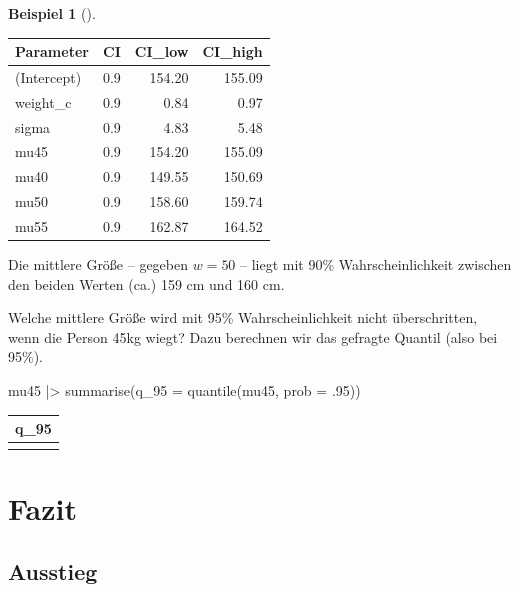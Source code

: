 \documentclass[
  ngerman,
  letterpaper,
  twoside,
  open=any]{scrbook}
\newenvironment{Shaded}{\begin{snugshade}}{\end{snugshade}}
\newcommand{\AttributeTok}[1]{\textcolor[rgb]{0.40,0.45,0.13}{#1}}
\newcommand{\DecValTok}[1]{\textcolor[rgb]{0.68,0.00,0.00}{#1}}
\newcommand{\FunctionTok}[1]{\textcolor[rgb]{0.28,0.35,0.67}{#1}}
\newcommand{\NormalTok}[1]{\textcolor[rgb]{0.00,0.23,0.31}{#1}}
\newcommand{\SpecialCharTok}[1]{\textcolor[rgb]{0.37,0.37,0.37}{#1}}
\newcounter{none} %
\theoremstyle{definition}
\newtheorem{example}{Beispiel}[chapter]
\theoremstyle{plain}
\theoremstyle{definition}
\theoremstyle{definition}
\theoremstyle{remark}
\begin{document}
\begin{example}[]
{\def\LTcaptype{none} %
\begin{longtable}[]{@{}lrrr@{}}
\toprule\noalign{}
Parameter & CI & CI\_low & CI\_high \\
\midrule\noalign{}
\endhead
\bottomrule\noalign{}
\endlastfoot
(Intercept) & 0.9 & 154.20 & 155.09 \\
weight\_c & 0.9 & 0.84 & 0.97 \\
sigma & 0.9 & 4.83 & 5.48 \\
mu45 & 0.9 & 154.20 & 155.09 \\
mu40 & 0.9 & 149.55 & 150.69 \\
mu50 & 0.9 & 158.60 & 159.74 \\
mu55 & 0.9 & 162.87 & 164.52 \\
\end{longtable}
}

Die mittlere Größe -- gegeben \(w=50\) -- liegt mit 90\%
Wahrscheinlichkeit zwischen den beiden Werten (ca.) 159 cm und 160 cm.

Welche mittlere Größe wird mit 95\% Wahrscheinlichkeit nicht
überschritten, wenn die Person 45kg wiegt? Dazu berechnen wir das
gefragte Quantil (also bei 95\%).

\begin{Shaded}
\begin{Highlighting}[]
\NormalTok{mu45 }\SpecialCharTok{|\textgreater{}}
  \FunctionTok{summarise}\NormalTok{(}\AttributeTok{q\_95 =} \FunctionTok{quantile}\NormalTok{(mu45, }\AttributeTok{prob =}\NormalTok{ .}\DecValTok{95}\NormalTok{))}
\end{Highlighting}
\end{Shaded}

{\def\LTcaptype{none} %
\begin{longtable}[]{@{}r@{}}
\toprule\noalign{}
q\_95 \\
\midrule\noalign{}
\endhead
\bottomrule\noalign{}
\endlastfoot
155 \\
\end{longtable}
}

\section{Fazit}\label{fazit-3}

\subsection{Ausstieg}\label{ausstieg}


\end{example}
\end{document}
